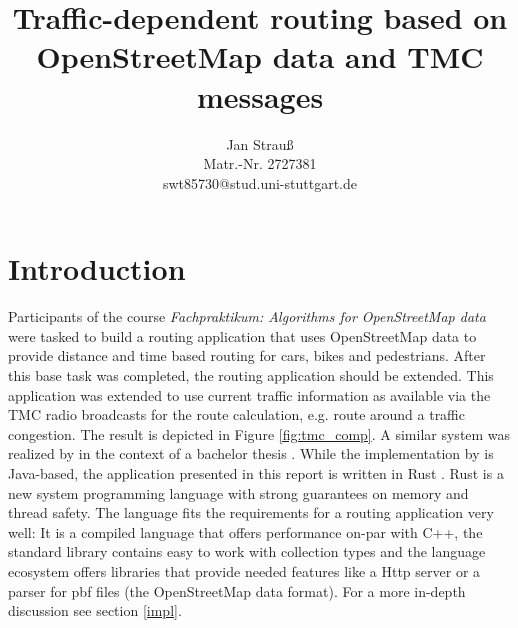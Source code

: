 \documentclass[a4paper]{scrartcl}
\title{Traffic-dependent routing based on OpenStreetMap data and TMC messages}
\author{
  Jan Strauß\\
  Matr.-Nr. 2727381\\
  swt85730@stud.uni-stuttgart.de
}
\date{}
\begin{document}
\maketitle


\section{Introduction}
Participants of the course \textit{Fachpraktikum: Algorithms for OpenStreetMap data} were tasked to build a routing application that uses OpenStreetMap \cite{osm_main} data to provide distance and time based routing for cars, bikes and pedestrians. After this base task was completed, the routing application should be extended. This application was extended to use current traffic information as available via the TMC radio broadcasts for the route calculation, e.g. route around a traffic congestion. The result is depicted in Figure \ref{fig:tmc_comp}. A similar system was realized by \citeauthor{sanwald2013} in the context of a bachelor thesis \cite{sanwald2013}. While the implementation by \citeauthor{sanwald2013} is Java-based, the application presented in this report is written in Rust \cite{rust_main}. Rust is a new system programming language with strong guarantees on memory and thread safety. The language fits the requirements for a routing application very well: It is a compiled language that offers performance on-par with C++, the standard library contains easy to work with collection types and the language ecosystem offers libraries that provide needed features like a Http server or a parser for pbf files (the OpenStreetMap data format). For a more in-depth discussion see section \ref{impl}.
\end{document}
